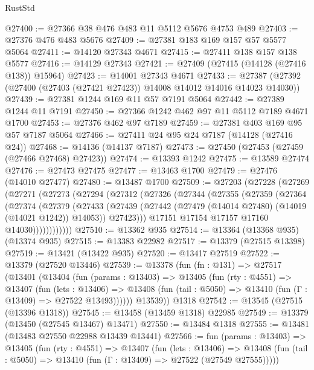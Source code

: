 \begin{lexlean}{RustStd}
\begin{coremodule}
@27400 := @27366 @38 @476 @483 @11 @5112 @5676 @4753 @489
@27403 := @27376 @476 @483 @5676
@27409 := @27381 @183 @169 @157 @57 @5577 @5064
@27411 := @14120 @27343 @4671
@27415 := @27411 @138 @157 @138 @5577
@27416 := @14129 @27343
@27421 := @27409 (@27415 (@14128 (@27416 @138)) @15964)
@27423 := @14001 @27343 @4671
@27433 := @27387 (@27392 (@27400 (@27403 (@27421 @27423)) @14008 @14012 @14016 @14023 @14030))
@27439 := @27381 @1244 @169 @11 @57 @7191 @5064
@27442 := @27389 @1244 @11 @7191
@27450 := @27366 @1242 @462 @97 @11 @5112 @7189 @4671 @1700
@27453 := @27376 @462 @97 @7189
@27459 := @27381 @403 @169 @95 @57 @7187 @5064
@27466 := @27411 @24 @95 @24 @7187 (@14128 (@27416 @24))
@27468 := @14136 (@14137 @7187)
@27473 := @27450 (@27453 (@27459 (@27466 @27468) @27423))
@27474 := @13393 @1242
@27475 := @13589 @27474
@27476 := @27473 @27475
@27477 := @13463 @1700
@27479 := @27476 (@14010 @27477)
@27480 := @13487 @1700
@27509 := @27203
    (@27228
      (@27269
        (@27271
          (@27273
            (@27294
              (@27312
                (@27326
                  (@27344
                    (@27355
                      (@27359
                        (@27364
                          (@27374
                            (@27379
                              (@27433
                                (@27439
                                  (@27442 (@27479 (@14014 @27480) (@14019 (@14021 @1242)) @14053))
                                  @27423)))
                            @17151
                            @17154
                            @17157
                            @17160
                            @14030))))))))))))
@27510 := @13362 @935
@27514 := @13364 (@13368 @935) (@13374 @935)
@27515 := @13383 @22982
@27517 := @13379 (@27515 @13398)
@27519 := @13421 (@13422 @935)
@27520 := @13417 @27519
@27522 := @13379 (@27520 @13446)
@27539 := @13378
    (fun (fn : @131) =>
    @27517
      (@13401
        (@13404
          (fun (params : @13403) =>
          @13405
            (fun (rty : @4551) =>
            @13407
              (fun (lets : @13406) =>
              @13408 (fun (tail : @5050) => @13410 (fun (Γ : @13409) => @27522 @13493))))))
        @13539))
    @1318
@27542 := @13545 (@27515 (@13396 @1318))
@27545 := @13458 (@13459 @1318) @22985
@27549 := @13379 (@13450 (@27545 @13467) @13471)
@27550 := @13484 @1318
@27555 := @13481 (@13483 @27550 @22988 @13439 @13441)
@27566 := fun (params : @13403) =>
  @13405
    (fun (rty : @4551) =>
    @13407
      (fun (lets : @13406) =>
      @13408 (fun (tail : @5050) => @13410 (fun (Γ : @13409) => @27522 (@27549 @27555)))))

\end{coremodule}
\end{lexlean}
